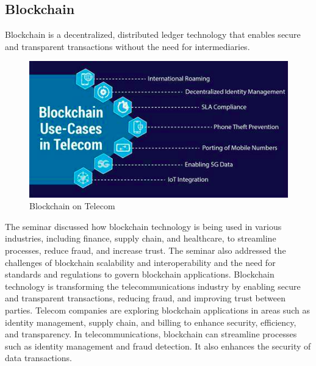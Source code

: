 \documentclass[conference]{IEEEtran}
\begin{document}
\subsection{Blockchain}
Blockchain is a decentralized, distributed ledger technology that enables secure and transparent transactions without the need for intermediaries. 
\begin{figure}[htbp]
    \centering
    \includegraphics[width=\linewidth]{images/blockchain.png}
    \caption{Blockchain on Telecom}
    \label{fig:blockchain-telecom}
\end{figure}
The seminar discussed how blockchain technology is being used in various industries, including finance, supply chain, and healthcare, to streamline processes, reduce fraud, and increase trust. The seminar also addressed the challenges of blockchain scalability and interoperability and the need for standards and regulations to govern blockchain applications. \cite{magedanz1996intelligent} Blockchain technology is transforming the telecommunications industry by enabling secure and transparent transactions, reducing fraud, and improving trust between parties. Telecom companies are exploring blockchain applications in areas such as identity management, supply chain, and billing to enhance security, efficiency, and transparency. In telecommunications, blockchain can streamline processes such as identity management and fraud detection. It also enhances the security of data transactions.
\end{document}
